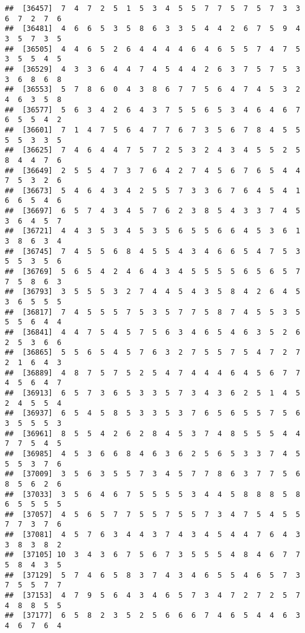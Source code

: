 \documentclass[
]{book}
\begin{document}
\begin{verbatim}
##  [36457]  7  4  7  2  5  1  5  3  4  5  5  7  7  5  7  5  7  3  3  6  7  2  7  6
##  [36481]  4  6  6  5  3  5  8  6  3  3  5  4  4  2  6  7  5  9  4  3  5  7  3  5
##  [36505]  4  4  6  5  2  6  4  4  4  4  6  4  6  5  5  7  4  7  5  3  5  5  4  5
##  [36529]  4  3  3  6  4  4  7  4  5  4  4  2  6  3  7  5  7  5  3  3  6  8  6  8
##  [36553]  5  7  8  6  0  4  3  8  6  7  7  5  6  4  7  4  5  3  2  4  6  3  5  8
##  [36577]  5  6  3  4  2  6  4  3  7  5  5  6  5  3  4  6  4  6  7  6  5  5  4  2
##  [36601]  7  1  4  7  5  6  4  7  7  6  7  3  5  6  7  8  4  5  5  5  5  3  3  5
##  [36625]  7  4  6  4  4  7  5  7  2  5  3  2  4  3  4  5  5  2  5  8  4  4  7  6
##  [36649]  2  5  5  4  7  3  7  6  4  2  7  4  5  6  7  6  5  4  4  7  5  3  2  6
##  [36673]  5  4  6  4  3  4  2  5  5  7  3  3  6  7  6  4  5  4  1  6  6  5  4  6
##  [36697]  6  5  7  4  3  4  5  7  6  2  3  8  5  4  3  3  7  4  5  3  6  4  5  7
##  [36721]  4  4  3  5  3  4  5  3  5  6  5  5  6  6  4  5  3  6  1  3  8  6  3  4
##  [36745]  7  4  5  5  6  8  4  5  5  4  3  4  6  6  5  4  7  5  3  5  5  3  5  6
##  [36769]  5  6  5  4  2  4  6  4  3  4  5  5  5  5  6  5  6  5  7  7  5  8  6  3
##  [36793]  3  5  5  5  3  2  7  4  4  5  4  3  5  8  4  2  6  4  5  3  6  5  5  5
##  [36817]  7  4  5  5  5  7  5  3  5  7  7  5  8  7  4  5  5  3  5  5  5  6  4  4
##  [36841]  4  4  7  5  4  5  7  5  6  3  4  6  5  4  6  3  5  2  6  2  5  3  6  6
##  [36865]  5  5  6  5  4  5  7  6  3  2  7  5  5  7  5  4  7  2  7  2  1  6  4  3
##  [36889]  4  8  7  5  7  5  2  5  4  7  4  4  4  6  4  5  6  7  7  4  5  6  4  7
##  [36913]  6  5  7  3  6  5  3  3  5  7  3  4  3  6  2  5  1  4  5  2  4  5  5  4
##  [36937]  6  5  4  5  8  5  3  3  5  3  7  6  5  6  5  5  7  5  6  3  5  5  5  3
##  [36961]  8  5  5  4  2  6  2  8  4  5  3  7  4  8  5  5  5  4  4  7  7  5  4  5
##  [36985]  4  5  3  6  6  8  4  6  3  6  2  5  6  5  3  3  7  4  5  5  5  3  7  6
##  [37009]  3  5  6  3  5  5  7  3  4  5  7  7  8  6  3  7  7  5  6  8  5  6  2  6
##  [37033]  3  5  6  4  6  7  5  5  5  5  3  4  4  5  8  8  8  5  8  6  5  5  5  5
##  [37057]  4  5  6  5  7  7  5  5  7  5  5  7  3  4  7  5  4  5  5  7  7  3  7  6
##  [37081]  4  5  7  6  3  4  4  3  7  4  3  4  5  4  4  7  6  4  3  3  8  3  8  2
##  [37105] 10  3  4  3  6  7  5  6  7  3  5  5  5  4  8  4  6  7  7  5  8  4  3  5
##  [37129]  5  7  4  6  5  8  3  7  4  3  4  6  5  5  4  6  5  7  3  7  5  5  7  7
##  [37153]  4  7  9  5  6  4  3  4  6  5  7  3  4  7  2  7  2  5  7  4  8  8  5  5
##  [37177]  6  5  8  2  3  5  2  5  6  6  6  7  4  6  5  4  4  6  3  4  6  7  6  4

\end{verbatim}
\end{document}
